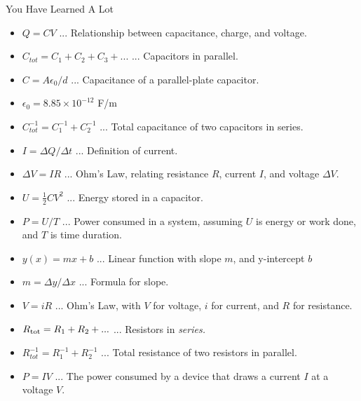 \documentclass{beamer}
\begin{document}
\begin{frame}{You Have Learned A Lot}
\scriptsize
\begin{itemize}
\item $Q = CV$ ... Relationship between capacitance, charge, and voltage.
\item $C_{tot} = C_1 + C_2 + C_3 + ...$ ... Capacitors in parallel.
\item $C = A\epsilon_0/d$ ... Capacitance of a parallel-plate capacitor.
\item $\epsilon_0 = 8.85 \times 10^{-12}$ F/m
\item $C_{tot}^{-1} = C_1^{-1} + C_2^{-1}$ ... Total capacitance of two capacitors in series.
\item $I = \Delta Q/\Delta t$ ... Definition of current.
\item $\Delta V = I R$ ... Ohm's Law, relating resistance $R$, current $I$, and voltage $\Delta V$.
\item $U = \frac{1}{2} C V^2$ ... Energy stored in a capacitor.
\item $P = U/T$ ... Power consumed in a system, assuming $U$ is energy or work done, and $T$ is time duration.
\item $y(x) = mx + b$ ... Linear function with slope $m$, and y-intercept $b$
\item $m = \Delta y / \Delta x$ ... Formula for slope.
\item $V = i R$ ... Ohm's Law, with $V$ for voltage, $i$ for current, and $R$ for resistance.
\item $R_{\rm tot} = R_1 + R_2 + ...$ ... Resistors in \textit{series.}
\item $R_{tot}^{-1} = R_1^{-1} + R_2^{-1}$ ... Total resistance of two resistors in parallel.
\item $P = IV$ ... The power consumed by a device that draws a current $I$ at a voltage $V$.
\end{itemize}
\end{frame}
\end{document}
